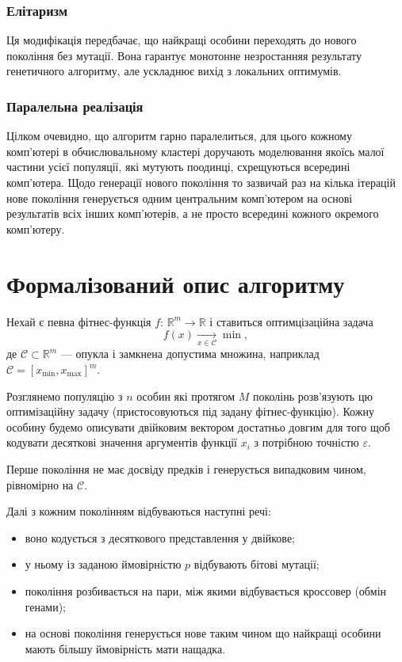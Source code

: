 \documentclass[a4paper, 12pt]{article}
\numberwithin{equation}{section}
\begin{document}
\subsubsection{Елітаризм}

Ця модифікація передбачає, що найкращі особини переходять до нового покоління без мутації. Вона гарантує монотонне незростанняя результату генетичного алгоритму, але ускладнює вихід з локальних оптимумів.

\subsubsection{Паралельна реалізація}

Цілком очевидно, що алгоритм гарно паралелиться, для цього кожному комп'ютері в обчислювальному кластері доручають моделювання якоїсь малої частини усієї популяції, які мутують поодинці, схрещуються всередині комп'ютера. Щодо генерації нового покоління то зазвичай раз на кілька ітерацій нове покоління генерується одним центральним комп'ютером на основі результатів всіх інших комп'ютерів, а не просто всередині кожного окремого комп'ютеру.

\section{Формалізований опис алгоритму}

Нехай є певна фітнес-функція $f$: $\mathbb{R}^m \to \mathbb{R}$ і ставиться оптимцізаційна задача
\begin{equation}
    f(x) \xrightarrow[x \in \mathcal{C}]{} \min,
\end{equation}
де $\mathcal{C} \subset \mathbb{R}^m$ --- опукла і замкнена допустима множина, наприклад $\mathcal{C} = [x_{\text{min}}, x_{\text{max}}]^m$. \medskip

Розглянемо популяцію з $n$ особин які протягом $M$ поколінь розв'язують цю оптимізаційну задачу (пристосовуються під задану фітнес-функцію). Кожну особину будемо описувати двійковим вектором достатньо довгим для того щоб кодувати десяткові значення аргументів функції $x_i$ з потрібною точністю $\varepsilon$. \medskip

Перше покоління не має досвіду предків і генерується випадковим чином, рівномірно на $\mathcal{C}$. \medskip

Далі з кожним поколінням відбуваються наступні речі:
\begin{itemize}
    \item воно кодується з десяткового представлення у двійкове;
    \item у ньому із заданою ймовірністю $p$ відбувають бітові мутації;
    \item покоління розбивається на пари, між якими відбувається кроссовер (обмін генами);
    \item на основі покоління генерується нове таким чином що найкращі особини мають більшу ймовірність мати нащадка.
\end{itemize}
\end{document}

